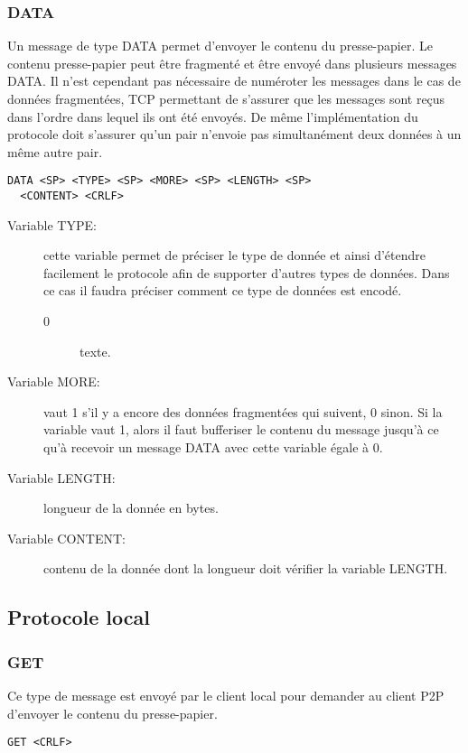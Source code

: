 \subsubsection*{DATA}
\label{msg:data_p2p}
Un message de type DATA permet d'envoyer le contenu du presse-papier.
Le contenu presse-papier peut être fragmenté et être envoyé dans plusieurs
messages DATA. Il n'est cependant pas
nécessaire de numéroter les messages dans le cas de données fragmentées,
TCP permettant de s'assurer que les messages sont reçus dans l'ordre
dans lequel ils ont été envoyés. De même l'implémentation du protocole doit
s'assurer qu'un pair n'envoie pas simultanément deux données à un même autre
pair.
\begin{verbatim}
DATA <SP> <TYPE> <SP> <MORE> <SP> <LENGTH> <SP>
  <CONTENT> <CRLF>
\end{verbatim}
\begin{description}
\item[Variable TYPE:] cette variable permet de préciser le type
  de donnée et ainsi d'étendre facilement le protocole afin de supporter
  d'autres types de données. Dans ce cas il faudra préciser comment ce type
  de données est encodé.
  \begin{description}
  \item[0] texte.
  \end{description}
\item[Variable MORE:] vaut 1 s'il y a encore des données fragmentées qui
  suivent, 0 sinon.
  Si la variable vaut 1, alors il faut bufferiser le contenu du message
  jusqu'à ce qu'à recevoir un message DATA avec cette variable égale à 0.
\item[Variable LENGTH:] longueur de la donnée en bytes.
\item[Variable CONTENT:] contenu de la donnée dont la longueur
  doit vérifier la variable LENGTH.
\end{description}

\subsection{Protocole local}
\subsubsection*{GET}
Ce type de message est envoyé par le client local pour demander au client P2P
d'envoyer le contenu du presse-papier.
\begin{verbatim}
GET <CRLF>
\end{verbatim}

